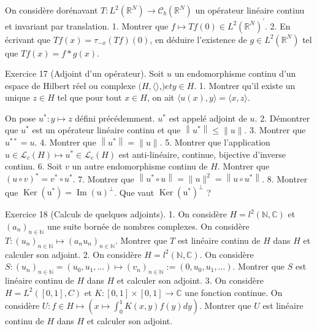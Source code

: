 \documentclass[12pt,a4paper]{article}
\begin{document}
On considère dorénavant \(T: L^{2}\left(\mathbb{R}^{N}\right) \rightarrow \mathcal{C}_{b}\left(\mathbb{R}^{N}\right)\) un opérateur linéaire continu et invariant par translation.
1. Montrer que \(f \mapsto T f(0) \in L^{2}\left(\mathbb{R}^{N}\right)^{\prime}\).
2. En écrivant que \(T f(x)=\tau_{-x}(T f)(0)\), en déduire l'existence de \(g \in L^{2}\left(\mathbb{R}^{N}\right)\) tel que \(T f(x)=f * g(x)\).

Exercice 17 (Adjoint d'un opérateur). Soit \(u\) un endomorphisme continu d'un espace de Hilbert réel ou complexe \((H,\langle\rangle\),\() et y \in H\).
1. Montrer qu'il existe un unique \(z \in H\) tel que pour tout \(x \in H\), on ait \(\langle u(x), y\rangle=\langle x, z\rangle\).

On pose \(u^{*}: y \mapsto z\) défini précédemment. \(u^{*}\) est appelé adjoint de \(u\).
2. Démontrer que \(u^{*}\) est un opérateur linéaire continu et que \(\left\|u^{*}\right\| \leqslant\|u\|\).
3. Montrer que \(u^{* *}=u\).
4. Montrer que \(\left\|u^{*}\right\|=\|u\|\).
5. Montrer que l'application \(u \in \mathcal{L}_{c}(H) \mapsto u^{*} \in \mathcal{L}_{c}(H)\) est anti-linéaire, continue, bijective d'inverse continu.
6. Soit \(v\) un autre endomorphisme continu de \(H\). Montrer que \((u \circ v)^{*}=v^{*} \circ u^{*}\).
7. Montrer que \(\left\|u^{*} \circ u\right\|=\|u\|^{2}=\left\|u \circ u^{*}\right\|\).
8. Montrer que \(\operatorname{Ker}\left(\mathrm{u}^{*}\right)=\operatorname{Im}(\mathrm{u})^{\perp}\). Que vaut \(\operatorname{Ker}\left(\mathrm{u}^{*}\right)^{\perp}\) ?

Exercice 18 (Calculs de quelques adjoints). 1. On considère \(H=l^{2}(\mathbb{N}, \mathbb{C})\) et \(\left(a_{n}\right)_{n \in \mathbb{N}}\) une suite bornée de nombres complexes. On considère \(T:\left(u_{n}\right)_{n \in \mathbb{N}} \mapsto\left(a_{n} u_{n}\right)_{n \in \mathbb{N}}\). Montrer que \(T\) est linéaire continu de \(H\) dans \(H\) et calculer son adjoint.
2. On considère \(H=l^{2}(\mathbb{N}, \mathbb{C})\). On considère \(S:\left(u_{n}\right)_{n \in \mathbb{N}}=\left(u_{0}, u_{1}, \ldots\right) \mapsto\left(v_{n}\right)_{n \in \mathbb{N}}:=\left(0, u_{0}, u_{1}, \ldots\right)\). Montrer que \(S\) est linéaire continu de \(H\) dans \(H\) et calculer son adjoint.
3. On considère \(H=L^{2}([0,1], C)\) et \(K:[0,1] \times[0,1] \rightarrow \mathbb{C}\) une fonction continue. On considère \(U: f \in H \mapsto \left(x \mapsto \int_{0}^{1} K(x, y) f(y) d y\right)\). Montrer que \(U\) est linéaire continu de \(H\) dans \(H\) et calculer son adjoint.
\end{document}
